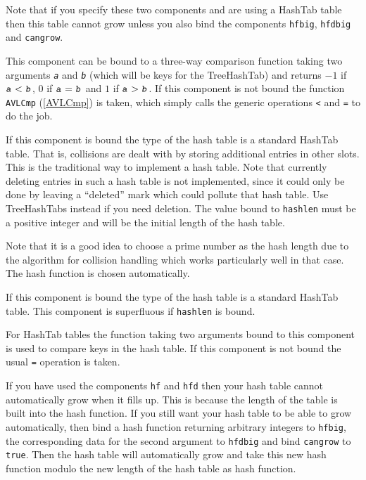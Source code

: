 \documentclass[a4paper,11pt]{report}
\begin{document}
{{{\begin{description}
 Note that if you specify these two components and are using a HashTab table
then this table cannot grow unless you also bind the components \texttt{hfbig}, \texttt{hfdbig} and \texttt{cangrow}. 
\item[{\texttt{cmpfunc}}]  This component can be bound to a three-way comparison function taking two
arguments \mbox{\texttt{\mdseries\slshape a}} and \mbox{\texttt{\mdseries\slshape b}} (which will be keys for the TreeHashTab) and returns $-1$ if $\mbox{\texttt{\mdseries\slshape a}}<\mbox{\texttt{\mdseries\slshape b}}$, $0$ if $\mbox{\texttt{\mdseries\slshape a}} = \mbox{\texttt{\mdseries\slshape b}}$ and $1$ if $\mbox{\texttt{\mdseries\slshape a}} > \mbox{\texttt{\mdseries\slshape b}}$. If this component is not bound the function \texttt{AVLCmp} (\ref{AVLCmp}) is taken, which simply calls the generic operations \texttt{{\textless}} and \texttt{=} to do the job. 
\item[{\texttt{hashlen}}]  If this component is bound the type of the hash table is a standard HashTab
table. That is, collisions are dealt with by storing additional entries in
other slots. This is the traditional way to implement a hash table. Note that
currently deleting entries in such a hash table is not implemented, since it
could only be done by leaving a ``deleted'' mark which could pollute that hash table. Use TreeHashTabs instead if you need
deletion. The value bound to \texttt{hashlen} must be a positive integer and will be the initial length of the hash table. 

 Note that it is a good idea to choose a prime number as the hash length due to
the algorithm for collision handling which works particularly well in that
case. The hash function is chosen automatically. 
\item[{\texttt{hashtab}}]  If this component is bound the type of the hash table is a standard HashTab
table. This component is superfluous if \texttt{hashlen} is bound. 
\item[{\texttt{eqf}}]  For HashTab tables the function taking two arguments bound to this component
is used to compare keys in the hash table. If this component is not bound the
usual \texttt{=} operation is taken. 
\item[{\texttt{hfbig} and \texttt{hfdbig} and \texttt{cangrow}}]  If you have used the components \texttt{hf} and \texttt{hfd} then your hash table cannot automatically grow when it fills up. This is
because the length of the table is built into the hash function. If you still
want your hash table to be able to grow automatically, then bind a hash
function returning arbitrary integers to \texttt{hfbig}, the corresponding data for the second argument to \texttt{hfdbig} and bind \texttt{cangrow} to \texttt{true}. Then the hash table will automatically grow and take this new hash function
modulo the new length of the hash table as hash function. 
\end{description}
 }

}}
\end{document}

